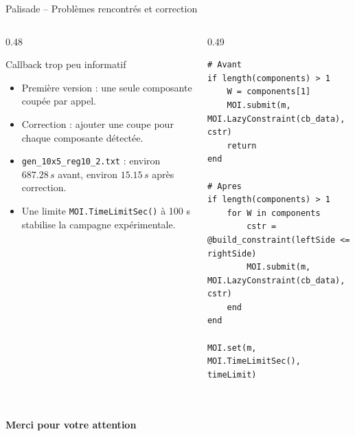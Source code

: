 \documentclass[11pt,aspectratio=169]{beamer}
\begin{document}
\begin{frame}[fragile]{Palisade -- Problèmes rencontrés et correction}
\small
\begin{columns}[T,onlytextwidth]
\begin{column}{0.48\textwidth}
\begin{block}{Callback trop peu informatif}
\begin{itemize}
  \item Première version : une seule composante coupée par appel.
  \item Correction : ajouter une coupe pour chaque composante détectée.
  \item \texttt{gen\_10x5\_reg10\_2.txt} : environ \(687.28\,s\) avant, environ \(15.15\,s\) après correction.
  \item Une limite \texttt{MOI.TimeLimitSec()} à 100 s stabilise la campagne expérimentale.
\end{itemize}
\end{block}
\end{column}
\begin{column}{0.49\textwidth}
\begin{lstlisting}[basicstyle=\ttfamily\tiny]
# Avant
if length(components) > 1
    W = components[1]
    MOI.submit(m, MOI.LazyConstraint(cb_data), cstr)
    return
end

# Apres
if length(components) > 1
    for W in components
        cstr = @build_constraint(leftSide <= rightSide)
        MOI.submit(m, MOI.LazyConstraint(cb_data), cstr)
    end
end

MOI.set(m, MOI.TimeLimitSec(), timeLimit)
\end{lstlisting}
\end{column}
\end{columns}
\end{frame}

\section{}

\begin{frame}
\begin{center}
{\LARGE\bfseries\color{enstaBlueDark} Merci pour votre attention}
\end{center}
\end{frame}
\end{document}

